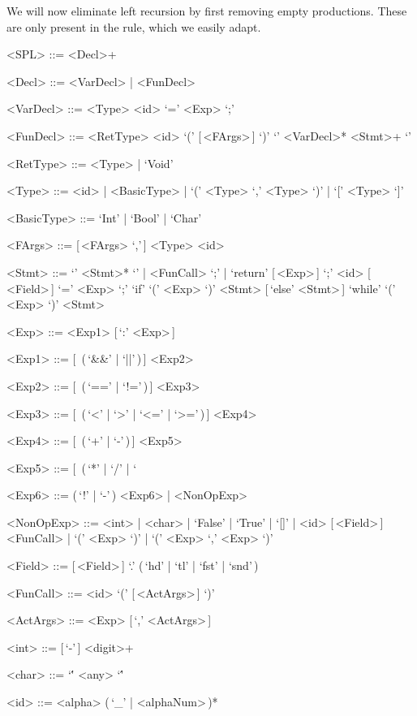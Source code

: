 \documentclass{article}
\begin{document}
We will now eliminate left recursion by first removing empty productions.
These are only present in the  rule, which we easily adapt.
\begin{grammar}
    <SPL> ::= <Decl>+

    <Decl> ::= <VarDecl> | <FunDecl>

    <VarDecl> ::= <Type> <id> `=' <Exp> `;'

    <FunDecl> ::= <RetType> <id> `(' [\,<FArgs>\,] `)' `{' <VarDecl>* <Stmt>+ `}'

    <RetType> ::= <Type> | `Void'

    <Type> ::= <id> | <BasicType> | `(' <Type> `,' <Type> `)' | `[' <Type> `]'

    <BasicType> ::= `Int' | `Bool' | `Char'

    <FArgs> ::= [\,<FArgs> `,'\,] <Type> <id>

    <Stmt> ::= `{' <Stmt>* `}' | <FunCall> `;' | `return' [\,<Exp>\,] `;'
    \alt <id> [\,<Field>\,] `=' <Exp> `;'
    \alt `if' `(' <Exp> `)' <Stmt> [\,`else' <Stmt>\,]
    \alt `while' `(' <Exp> `)' <Stmt>

    <Exp> ::= <Exp1> [\,`:' <Exp>\,]

    <Exp1> ::= [\,<Exp1> (\,`&&' | `||'\,)\,] <Exp2>

    <Exp2> ::= [\,<Exp2> (\,`==' | `!='\,)\,] <Exp3>

    <Exp3> ::= [\,<Exp3> (\,`<' | `>' | `<=' | `>='\,)\,] <Exp4>

    <Exp4> ::= [\,<Exp4> (\,`+' | `-'\,)\,] <Exp5>

    <Exp5> ::= [\,<Exp5> (\,`*' | `/' | `%

    <Exp6> ::= (\,`!' | `-'\,) <Exp6> | <NonOpExp>

    <NonOpExp> ::= <int> | <char> | `False' | `True' | `[]' | <id> [\,<Field>\,]
    \alt <FunCall> | `(' <Exp> `)' | `(' <Exp> `,' <Exp> `)'

    <Field> ::= [\,<Field>\,] `.' (\,`hd' | `tl' | `fst' | `snd'\,)

    <FunCall> ::= <id> `(' [\,<ActArgs>\,] `)'

    <ActArgs> ::= <Exp> [\,`,' <ActArgs>\,]

    <int> ::= [\,`-'\,] <digit>+

    <char> ::= `\'' <any> `\''

    <id> ::= <alpha> (\,`_' | <alphaNum>\,)*
\end{grammar}
\end{document}
